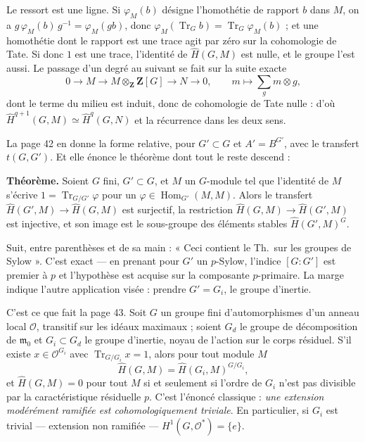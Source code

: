 \documentclass[11pt,a4paper]{article}
\begin{document}
Le ressort est une ligne. Si $\varphi_M(b)$ désigne l'homothétie de rapport $b$
dans $M$, on a $g\,\varphi_M(b)\,g^{-1} = \varphi_M(gb)$, donc
$\varphi_M(\operatorname{Tr}_G b) = \operatorname{Tr}_G \varphi_M(b)$ ; et une
homothétie dont le rapport est une trace agit par zéro sur la cohomologie de
Tate. Si donc $1$ est une trace, l'identité de $\widehat{H}(G,M)$ est nulle, et
le groupe l'est aussi. Le passage d'un degré au suivant se fait sur la suite
exacte
\[
0 \longrightarrow M \longrightarrow M \otimes_{\mathbf{Z}} \mathbf{Z}[G]
\longrightarrow N \longrightarrow 0, \qquad m \longmapsto \sum_g m \otimes g,
\]
dont le terme du milieu est induit, donc de cohomologie de Tate nulle : d'où
$\widehat{H}^{q+1}(G,M) \simeq \widehat{H}^{q}(G,N)$ et la récurrence dans les
deux sens.

La page 42 en donne la forme relative, pour $G' \subset G$ et $A' = B^{G'}$,
avec le transfert $t(G,G')$. Et elle énonce le théorème dont tout le reste
descend :

\textbf{Théorème.} Soient $G$ fini, $G' \subset G$, et $M$ un $G$-module tel
que l'identité de $M$ s'écrive $1 = \operatorname{Tr}_{G/G'}\varphi$ pour un
$\varphi \in \operatorname{Hom}_{G'}(M,M)$. Alors le transfert
$\widehat{H}(G',M) \to \widehat{H}(G,M)$ est surjectif, la restriction
$\widehat{H}(G,M) \to \widehat{H}(G',M)$ est injective, et son image est le
sous-groupe des éléments stables $\widehat{H}(G',M)^{G}$.

Suit, entre parenthèses et de sa main : « Ceci contient le Th.\ sur les groupes
de Sylow ». C'est exact — en prenant pour $G'$ un $p$-Sylow, l'indice $[G:G']$
est premier à $p$ et l'hypothèse est acquise sur la composante $p$-primaire.
La marge indique l'autre application visée : prendre $G' = G_i$, le groupe
d'inertie.

C'est ce que fait la page 43. Soit $G$ un groupe fini d'automorphismes d'un
anneau local $\mathcal{O}$, transitif sur les idéaux maximaux ; soient $G_d$ le
groupe de décomposition de $\mathfrak{m}_0$ et $G_i \subset G_d$ le groupe
d'inertie, noyau de l'action sur le corps résiduel. S'il existe
$x \in \mathcal{O}^{G_i}$ avec $\operatorname{Tr}_{G/G_i} x = 1$, alors pour
tout module $M$
\[
\widehat{H}(G,M) = \widehat{H}(G_i,M)^{G/G_i},
\]
et $\widehat{H}(G,M) = 0$ pour tout $M$ si et seulement si l'ordre de $G_i$
n'est pas divisible par la caractéristique résiduelle $p$. C'est l'énoncé
classique : \emph{une extension modérément ramifiée est cohomologiquement
triviale}. En particulier, si $G_i$ est trivial — extension non ramifiée —
$H^1(G, \mathcal{O}^{*}) = \{e\}$.
\end{document}
